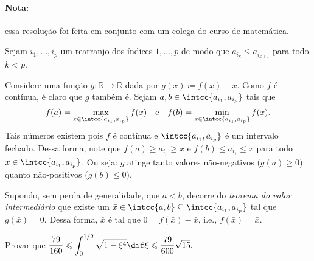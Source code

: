 \documentclass{IMTexam}
\begin{document}
\begin{questions}
\begin{solution}
			\paragraph{Nota:} essa resolução foi feita em conjunto com um colega do curso de matemática.
			
			Sejam ${i_1}, \ldots, i_p$ um rearranjo dos índices $1,\ldots,p$ de modo que $a_{i_{k}} \leqslant a_{i_{k+1}}$ para todo $k<p$.
		
			
			
			Considere uma função $g\colon \mathbb{R} \longrightarrow\mathbb{R}$ dada por $g(x) \coloneqq f(x)-x$. Como $f$ é contínua, é claro que $g$ também é. Sejam $a,b\in\intcc{a_{i_1},a_{i_p}}$ tais que
			$$f(a) = \max\limits_{x\in\intcc{a_{i_1},a_{i_p}} } f(x) \quad\text{e}\quad f(b) = \min\limits_{x\in\intcc{a_{i_1},a_{i_p}} } f(x).$$
			Tais números existem pois $f$ é contínua e $\intcc{a_{i_1},a_{i_p}}$ é um intervalo fechado. 	Dessa forma, note que $f(a) \geqslant a_{i_p} \geqslant x$  e $f(b)\leqslant a_{i_1} \leqslant x$ para todo $x\in \intcc{a_{i_1},a_{i_p}}$. Ou seja: $g$ atinge tanto valores não-negativos ($g(a)\geqslant 0$) quanto não-positivos ($g(b)\leqslant 0$). 
			
			Supondo, sem perda de generalidade, que $a<b$, decorre do \textit{teorema do valor intermediário} que existe um $\bar x\in \intcc{a,b} \subseteq \intcc{a_{i_1},a_{i_p}}$ tal que $g(\bar x) = 0$. Dessa forma, $\bar x$ é tal que $0 =  f(\bar x) - \bar x$, i.e., $f(\bar x) = \bar x$.
			
			\hfill\qedsymbol
		\end{solution}
		
		\clearpage
		
		
		Provar que $ \dfrac{79}{160}\leqslant\displaystyle\int_{0}^{1/2}\sqrt{1-\xi^{4}}\dif \xi \leqslant \dfrac{79}{600}\sqrt{15}. $
		

\end{questions}
\end{document}
